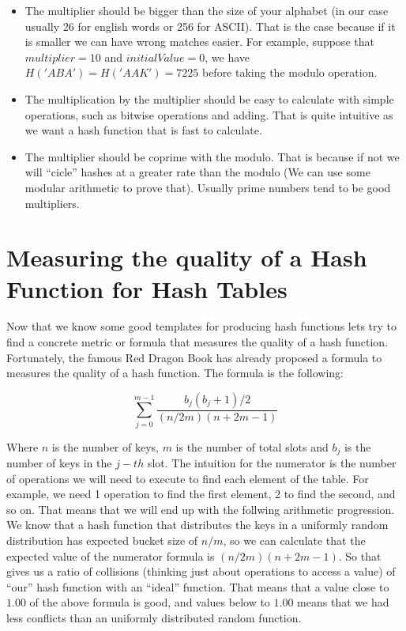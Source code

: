 \begin{itemize}
\item The multiplier should be bigger than the size of your alphabet (in our case usually 26 for english words or 256 for ASCII). That is the case because if it is smaller we can have wrong matches easier. For example, suppose that \( multiplier = 10 \) and \( initialValue = 0 \), we have \( H('ABA') = H('AAK') = 7225 \) before taking the modulo operation.

\item The multiplication by the multiplier should be easy to calculate with simple operations, such as bitwise operations and adding. That is quite intuitive as we want a hash function that is fast to calculate. 

\item The multiplier should be coprime with the modulo. That is because if not we will ``cicle'' hashes at a greater rate than the modulo (We can use some modular arithmetic to prove that). Usually prime numbers tend to be good multipliers.
\end{itemize}

\section{Measuring the quality of a Hash Function for Hash Tables}

Now that we know some good templates for producing hash functions lets try to find a concrete metric or formula that measures the quality of a hash function. Fortunately, the famous Red Dragon Book \cite{DragonBook} has already proposed a formula to measures the quality of a hash function. The formula is the following:

\[ \sum_{j = 0}^{m - 1} \frac{b_j(b_j + 1)/2}{ (n/2m)(n + 2m - 1) } \]

Where \( n \) is the number of keys, \( m \) is the number of total slots and \( b_j \) is the number of keys in the \( j-th \) slot. The intuition for the numerator is the number of operations we will need to execute to find each element of the table. For example, we need 1 operation to find the first element, 2 to find the second, and so on. That means that we will end up with the follwing arithmetic progression. We know that a hash function that distributes the keys in a uniformly random distribution has expected bucket size of \( n / m \), so we can calculate that the expected value of the numerator formula is \( (n/2m)(n + 2m - 1) \). So that gives us a ratio of collisions (thinking just about operations to access a value) of ``our'' hash function with an ``ideal'' function. That means that a value close to \( 1.00 \) of the above formula is good, and values below to \( 1.00 \) means that we had less conflicts than an uniformly distributed random function.

